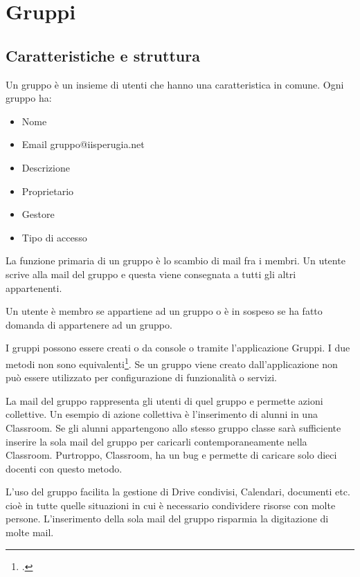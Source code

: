 \chapter{Gruppi}
\section{Caratteristiche e struttura}
Un gruppo è un insieme di utenti che hanno una caratteristica in comune.
Ogni gruppo ha:
\begin{itemize}
	\item Nome	
	\item Email gruppo@iisperugia.net
	\item Descrizione
	\item Proprietario 
	\item Gestore
	\item Tipo di accesso
\end{itemize}
La funzione primaria di un gruppo è lo scambio di mail fra i membri. Un utente scrive alla mail del gruppo e questa viene consegnata a tutti gli altri appartenenti. 

Un utente  è membro se appartiene ad un gruppo o è in sospeso se ha fatto domanda di appartenere ad un gruppo.

I gruppi possono essere creati o da console o tramite l'applicazione Gruppi.
I due metodi non sono equivalenti\footcite{Google2023f}. Se un gruppo viene creato dall'applicazione non può essere utilizzato per configurazione di funzionalità o servizi.
 
La mail del gruppo rappresenta gli utenti di quel gruppo e permette azioni collettive. Un esempio di azione collettiva è l'inserimento di alunni in una Classroom. Se gli alunni appartengono allo stesso gruppo classe sarà sufficiente inserire la sola mail del gruppo per caricarli contemporaneamente nella Classroom. Purtroppo,  Classroom, ha un bug e permette di caricare solo dieci docenti con questo metodo. 

L'uso del gruppo facilita la gestione di Drive condivisi, Calendari, documenti etc. cioè in tutte quelle situazioni in cui è necessario condividere risorse con molte persone. L'inserimento della sola mail del gruppo risparmia la digitazione di molte mail.

